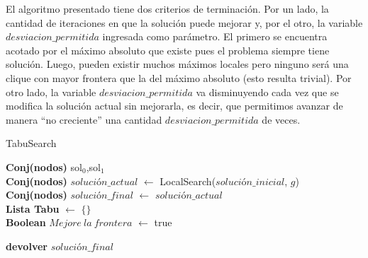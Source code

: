  El algoritmo presentado tiene dos criterios de terminación. Por un lado, la cantidad de iteraciones en que la solución puede mejorar y, por el otro, la variable $desviacion\_permitida$ ingresada como parámetro. El primero se encuentra acotado por el máximo absoluto que existe pues el problema siempre tiene solución. Luego, pueden existir muchos máximos locales pero ninguno será una clique con mayor frontera que la del máximo absoluto (esto resulta trivial). Por otro lado, la variable $desviacion\_permitida$ va disminuyendo cada vez que se modifica la solución actual sin mejorarla, es decir, que permitimos avanzar de manera ``no creciente'' una cantidad $desviacion\_permitida$ de veces. \newline




\begin{algorithm}[H]
    \SetAlgoLined
    \caption{TabuSearch}

	\textbf{Conj(nodos)} sol$_{0}$,sol$_{1}$ \\ 
	\textbf{Conj(nodos)} $solución\_actual$ $\leftarrow$ LocalSearch($solución\_inicial$, $g$)	\\	
	\textbf{Conj(nodos)} $solución\_final$ $\leftarrow$ $solución\_actual$	\\	
	\textbf{Lista Tabu} $\leftarrow$ $\{\}$\\
	\textbf{Boolean} $Mejore\ la\ frontera$ $\leftarrow$ true


    	\textbf{devolver} $solución\_final$ \\

\end{algorithm}

